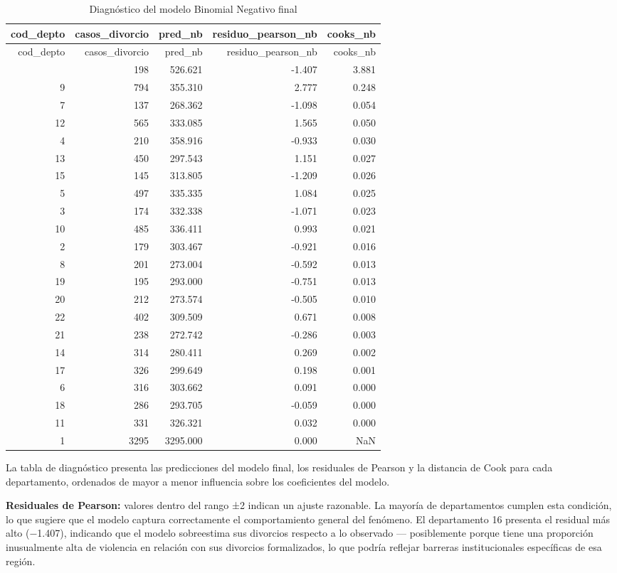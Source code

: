 \documentclass[
]{article}
\begin{document}
\begin{longtable}[]{@{}rrrrr@{}}
\caption{Diagnóstico del modelo Binomial Negativo final}\tabularnewline
\toprule\noalign{}
cod\_depto & casos\_divorcio & pred\_nb & residuo\_pearson\_nb &
cooks\_nb \\
\midrule\noalign{}
\endfirsthead
\toprule\noalign{}
cod\_depto & casos\_divorcio & pred\_nb & residuo\_pearson\_nb &
cooks\_nb \\
\midrule\noalign{}
\endhead
\bottomrule\noalign{}
\endlastfoot
16 & 198 & 526.621 & -1.407 & 3.881 \\
9 & 794 & 355.310 & 2.777 & 0.248 \\
7 & 137 & 268.362 & -1.098 & 0.054 \\
12 & 565 & 333.085 & 1.565 & 0.050 \\
4 & 210 & 358.916 & -0.933 & 0.030 \\
13 & 450 & 297.543 & 1.151 & 0.027 \\
15 & 145 & 313.805 & -1.209 & 0.026 \\
5 & 497 & 335.335 & 1.084 & 0.025 \\
3 & 174 & 332.338 & -1.071 & 0.023 \\
10 & 485 & 336.411 & 0.993 & 0.021 \\
2 & 179 & 303.467 & -0.921 & 0.016 \\
8 & 201 & 273.004 & -0.592 & 0.013 \\
19 & 195 & 293.000 & -0.751 & 0.013 \\
20 & 212 & 273.574 & -0.505 & 0.010 \\
22 & 402 & 309.509 & 0.671 & 0.008 \\
21 & 238 & 272.742 & -0.286 & 0.003 \\
14 & 314 & 280.411 & 0.269 & 0.002 \\
17 & 326 & 299.649 & 0.198 & 0.001 \\
6 & 316 & 303.662 & 0.091 & 0.000 \\
18 & 286 & 293.705 & -0.059 & 0.000 \\
11 & 331 & 326.321 & 0.032 & 0.000 \\
1 & 3295 & 3295.000 & 0.000 & NaN \\
\end{longtable}

La tabla de diagnóstico presenta las predicciones del modelo final, los
residuales de Pearson y la distancia de Cook para cada departamento,
ordenados de mayor a menor influencia sobre los coeficientes del modelo.

\textbf{Residuales de Pearson:} valores dentro del rango ±2 indican un
ajuste razonable. La mayoría de departamentos cumplen esta condición, lo
que sugiere que el modelo captura correctamente el comportamiento
general del fenómeno. El departamento 16 presenta el residual más alto
(−1.407), indicando que el modelo sobreestima sus divorcios respecto a
lo observado --- posiblemente porque tiene una proporción inusualmente
alta de violencia en relación con sus divorcios formalizados, lo que
podría reflejar barreras institucionales específicas de esa región.
\end{document}
